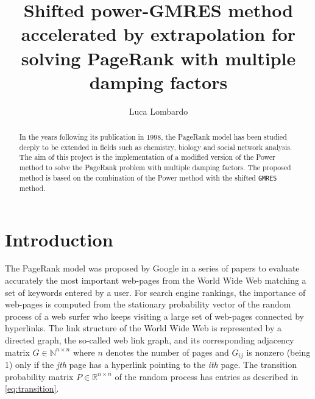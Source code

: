 \documentclass[12pt]{article}
\title{Shifted power-GMRES method accelerated by extrapolation
for solving PageRank with multiple damping factors}
\author{Luca Lombardo}
\date{}
\newcommand{\R}{\mathbb{R}}
\newcommand{\N}{\mathbb{N}}
\begin{document}
\maketitle

\begin{abstract}
    \noindent In the years following its publication in 1998, the PageRank model has been studied deeply to be extended in fields such as chemistry, biology and social network analysis. The aim of this project is the implementation of a modified version of the Power method to solve the PageRank problem with multiple damping factors. The proposed method is based on the combination of the Power method with the shifted \texttt{GMRES} method.

\end{abstract}
\tableofcontents
\clearpage

\section{Introduction}

The PageRank model was proposed by Google in a series of papers to evaluate accurately the most important web-pages from the World Wide Web matching a set of keywords entered by a user. For search engine rankings, the importance of web-pages is computed from the stationary probability vector of the random process of a web surfer who keeps visiting a large set of web-pages connected by hyperlinks. The link structure of the World Wide Web is represented by a directed graph, the so-called web link graph, and its corresponding adjacency matrix $G \in \N^{n \times n}$ where $n$ denotes the number of pages and $G_{ij}$ is nonzero (being 1) only if the \emph{jth} page has a hyperlink pointing to the \emph{ith} page. The transition probability matrix $P \in \R^{n \times n}$ of the random process has entries as described in \ref{eq:transition}.
\end{document}

